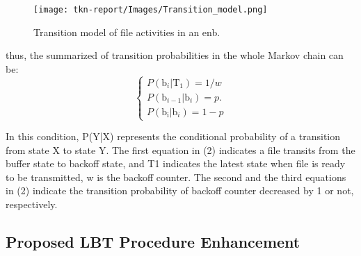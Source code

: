 \documentclass{IEEEtran}
\begin{document}
  
  
  
\graphicspath{{Images/}}
\maketitle
\begin{figure}[htp]
\centering
\texttt{[image: tkn-report/Images/Transition\_model.png]}
\caption{Transition model of file activities in an enb.}
\label{fig:lion}
\end{figure}
  
  
  
  
thus, the summarized of transition probabilities in the whole Markov chain can be: 
  \begin{equation*}\begin{cases}P(\text{b}_{i}\vert \text{T}_{1})=1/w\\ P(\text{b}_{i-1}\vert \text{b}_{i})=p.\\ P(\text{b}_{\text{i}}\vert \text{b}_{i})=1-p \end{cases}\tag{2}\end{equation*}
  
  In this condition, P(Y|X) represents the conditional probability of a transition from state X to state Y. The first equation in (2) indicates a file transits from the buffer state to backoff state, and T1 indicates the latest state when file is ready to be transmitted, w is the backoff counter. The second and the third equations in (2) indicate the transition probability of backoff counter decreased by 1 or not, respectively.
  
  

\subsection{Proposed LBT Procedure Enhancement}
\end{document}
